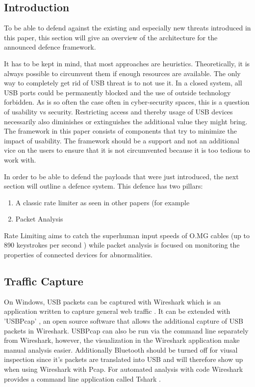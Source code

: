 \subsection{Introduction}

To be able to defend against the existing and especially new threats introduced in this paper, this section will give an overview of the architecture for the announced defence framework.

It has to be kept in mind, that most approaches are heuristics. Theoretically, it is always possible to circumvent them if enough resources are available. The only way to completely get rid of USB threat is to not use it. In a closed system, all USB ports could be permanently blocked and the use of outside technology forbidden. As is so often the case  often in cyber-security spaces, this is a question of usability vs security. Restricting access and thereby usage of USB devices necessarily also diminishes or extinguishes the additional value they might bring. The framework in this paper consists of components that try to minimize the impact of usability. The framework should be a support and not an additional vice on the users to ensure that it is not circumvented because it is too tedious to work with.  

In order to be able to defend the payloads that were just introduced, the next section will outline a defence system.
This defence has two pillars:
\begin{enumerate}
    \item A classic rate limiter as seen in other papers (for example \cite{neunerUSBlockBlockingUSBBased2018}
    \item Packet Analysis
\end{enumerate}

Rate Limiting aims to catch the superhuman input speeds of O.MG cables (up to 890 keystrokes per second \cite{hak5MGCable}) while packet analysis is focused on monitoring the properties of connected devices for abnormalities.


\subsection{Traffic Capture} \label{Traffic Capture}

On Windows, USB packets can be captured with Wireshark which is an application written to capture general web traffic \cite{WiresharkGoDeep}. It can be extended with 'USBPcap' \cite{USBPcap}, an open source software that allows the additional capture of USB packets in Wireshark. USBPcap can also be run via the command line separately from Wireshark, however, the visualization in the Wireshark application make manual analysis easier.  Additionally Bluetooth should be turned off for viusal inspection since it's packets are translated into USB and will therefore show up when using Wireshark with Pcap. For automated analysis with code Wireshark provides a command line application called Tshark \cite{TsharkTsharkDev}. 

